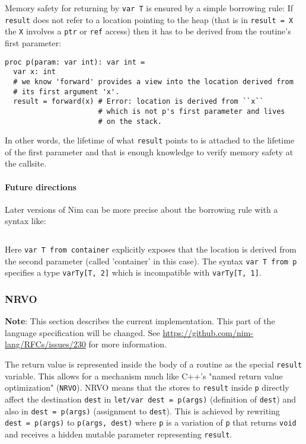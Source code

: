 Memory safety for returning by \texttt{var\ T} is ensured by a simple
borrowing rule: If \texttt{result} does not refer to a location pointing
to the heap (that is in \texttt{result\ =\ X} the \texttt{X} involves a
\texttt{ptr} or \texttt{ref} access) then it has to be derived from the
routine's first parameter:

\begin{verbatim}
proc p(param: var int): var int =
  var x: int
  # we know 'forward' provides a view into the location derived from
  # its first argument 'x'.
  result = forward(x) # Error: location is derived from ``x``
                      # which is not p's first parameter and lives
                      # on the stack.
\end{verbatim}

In other words, the lifetime of what \texttt{result} points to is
attached to the lifetime of the first parameter and that is enough
knowledge to verify memory safety at the callsite.

\hypertarget{future-directions}{%
\paragraph{Future directions}\label{future-directions}}

Later versions of Nim can be more precise about the borrowing rule with
a syntax like:

\begin{verbatim}
\end{verbatim}

Here \texttt{var\ T\ from\ container} explicitly exposes that the
location is derived from the second parameter (called 'container' in
this case). The syntax \texttt{var\ T\ from\ p} specifies a type
\texttt{varTy{[}T,\ 2{]}} which is incompatible with
\texttt{varTy{[}T,\ 1{]}}.

\hypertarget{nrvo}{%
\subsubsection{NRVO}\label{nrvo}}

\textbf{Note}: This section describes the current implementation. This
part of the language specification will be changed. See
\url{https://github.com/nim-lang/RFCs/issues/230} for more information.

The return value is represented inside the body of a routine as the
special \texttt{result} variable. This allows for a mechanism much like
C++'s "named return value optimization" (\texttt{NRVO}). NRVO means that
the stores to \texttt{result} inside \texttt{p} directly affect the
destination \texttt{dest} in \texttt{let/var\ dest\ =\ p(args)}
(definition of \texttt{dest}) and also in \texttt{dest\ =\ p(args)}
(assignment to \texttt{dest}). This is achieved by rewriting
\texttt{dest\ =\ p(args)} to \texttt{p\textquotesingle{}(args,\ dest)}
where \texttt{p\textquotesingle{}} is a variation of \texttt{p} that
returns \texttt{void} and receives a hidden mutable parameter
representing \texttt{result}.

